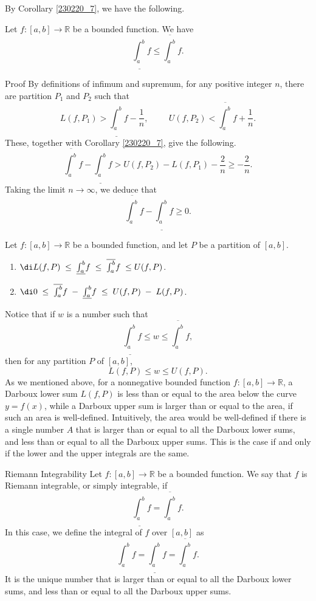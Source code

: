 By Corollary \ref{230220_7}, we have the following.
\begin{proposition}{}
Let $f:[a,b]\to\mathbb{R}$ be a bounded function. We have
\[\underline{\int_a^b}f\leq \overline{\int_a^b}f.\]
\end{proposition}
\begin{myproof}{Proof}
By definitions of infimum and supremum, for any positive integer $n$, there are partition $P_1$ and $P_2$ such that
\[L(f,P_1)>\underline{\int_a^b}f-\frac{1}{n},\hspace{1cm}U(f,P_2)< \overline{\int_a^b}f+\frac{1}{n}.\]
These, together with Corollary \ref{230220_7}, give the following.
\[ \overline{\int_a^b}f-\underline{\int_a^b}f>U(f,P_2)-L(f,P_1)-\frac{2}{n}\geq -\frac{2}{n}.\]
Taking the limit $n\to\infty$, we deduce that
\[\overline{\int_a^b}f-\underline{\int_a^b}f\geq 0.\]
\end{myproof}
\begin{highlight}{}
Let $f:[a,b]\to\mathbb{R}$ be a bounded function, and let  $P$ be a partition of $[a,b]$.
\begin{enumerate}[1.]
\item $\di L(f,P)\;\leq \;\underline{\int_a^b} f\;\leq \;\overline{\int_a^b }f \;\leq U(f,P)$.
\item $\di 0\;\leq \;\overline{\int_a^b }f \;-\;\underline{\int_a^b} f\;\leq\;U(f,P)\;-\;L(f,P)$.

\end{enumerate}
\end{highlight}
Notice that if $w$ is a number such that
\[\underline{\int_a^b}f\leq w\leq \overline{\int_a^b}f,\]then
for any partition $P$ of $[a,b]$,
\[L(f,P)\leq w\leq U(f,P).\]
As we mentioned above, for a nonnegative bounded function $f:[a,b]\to\mathbb{R}$, a Darboux lower sum $L(f,P)$ is less  than or equal to the area below the curve $y=f(x)$, while a Darboux upper sum is larger than or equal to the area, if such an area is well-defined. Intuitively, the area would be well-defined if there is a single number $A$ that is larger than or equal to all the Darboux lower sums, and less than or equal to all the Darboux upper sums. This is the case if and only if the lower and the upper integrals are the same. 
\begin{definition}{Riemann Integrability}
Let $f:[a,b]\to \mathbb{R}$ be a bounded function. We say that $f$ is Riemann integrable, or simply integrable, if 
\[\underline{\int_a^b}f= \overline{\int_a^b}f.\]In this case, we define the integral of $f$ over $[a,b]$ as
\[\int_a^b f=\underline{\int_a^b}f=\overline{\int_a^b}f.\]
It is the unique number  that is larger than or equal to all the Darboux lower sums, and less than or equal to all the Darboux upper sums.
\end{definition}

